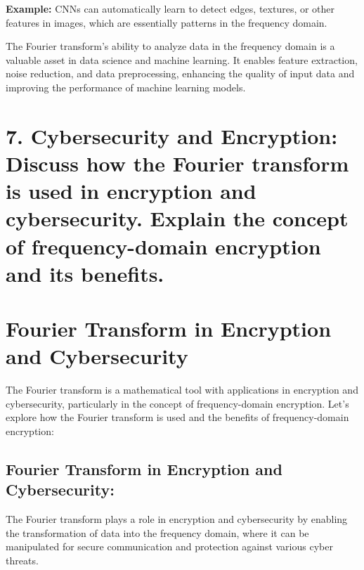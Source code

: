 \documentclass[11pt]{article}
\begin{document}
\textbf{Example:} CNNs can automatically learn to detect edges,
textures, or other features in images, which are essentially patterns in
the frequency domain.

The Fourier transform's ability to analyze data in the frequency domain
is a valuable asset in data science and machine learning. It enables
feature extraction, noise reduction, and data preprocessing, enhancing
the quality of input data and improving the performance of machine
learning models.

    \hypertarget{cybersecurity-and-encryption-discuss-how-the-fourier-transform-is-used-in-encryption-and-cybersecurity.-explain-the-concept-of-frequency-domain-encryption-and-its-benefits.}{%
\section{7. Cybersecurity and Encryption: Discuss how the Fourier
transform is used in encryption and cybersecurity. Explain the concept
of frequency-domain encryption and its
benefits.}\label{cybersecurity-and-encryption-discuss-how-the-fourier-transform-is-used-in-encryption-and-cybersecurity.-explain-the-concept-of-frequency-domain-encryption-and-its-benefits.}}

    \hypertarget{fourier-transform-in-encryption-and-cybersecurity}{%
\section{Fourier Transform in Encryption and
Cybersecurity}\label{fourier-transform-in-encryption-and-cybersecurity}}

The Fourier transform is a mathematical tool with applications in
encryption and cybersecurity, particularly in the concept of
frequency-domain encryption. Let's explore how the Fourier transform is
used and the benefits of frequency-domain encryption:

\hypertarget{fourier-transform-in-encryption-and-cybersecurity-1}{%
\subsection{Fourier Transform in Encryption and
Cybersecurity:}\label{fourier-transform-in-encryption-and-cybersecurity-1}}

The Fourier transform plays a role in encryption and cybersecurity by
enabling the transformation of data into the frequency domain, where it
can be manipulated for secure communication and protection against
various cyber threats.
\end{document}
